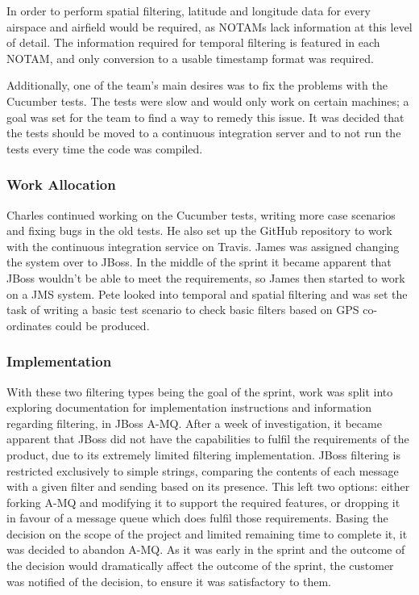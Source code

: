 \documentclass[a4paper, 12pt, twoside]{article}
\begin{document}
In order to perform spatial filtering, latitude and longitude data for every airspace and airfield would be required, as NOTAMs lack information at this level of detail. The information required for temporal filtering is featured in each NOTAM, and only conversion to a usable timestamp format was required.

Additionally, one of the team's main desires was to fix the problems with the Cucumber tests. The tests were slow and would only work on certain machines; a goal was set for the team to find a way to remedy this issue. It was decided that the tests should be moved to a continuous integration server and to not run the tests every time the code was compiled.

\subsubsection{Work Allocation}

Charles continued working on the Cucumber tests, writing more case scenarios and fixing bugs in the old tests. He also set up the GitHub repository to work with the continuous integration service on Travis. James was assigned changing the system over to JBoss. In the middle of the sprint it became apparent that JBoss wouldn't be able to meet the requirements, so James then started to work on a JMS system. Pete looked into temporal and spatial filtering and was set the task of writing a basic test scenario to check basic filters based on GPS co-ordinates could be produced.

\subsubsection{Implementation}

With these two filtering types being the goal of the sprint, work was split into exploring documentation for implementation instructions and information regarding filtering, in JBoss A-MQ. After a week of investigation, it became apparent that JBoss did not have the capabilities to fulfil the requirements of the product, due to its extremely limited filtering implementation. JBoss filtering is restricted exclusively to simple strings, comparing the contents of each message with a given filter and sending based on its presence. This left two options: either forking A-MQ and modifying it to support the required features, or dropping it in favour of a message queue which does fulfil those requirements. Basing the decision on the scope of the project and limited remaining time to complete it, it was decided to abandon A-MQ. As it was early in the sprint and the outcome of the decision would dramatically affect the outcome of the sprint, the customer was notified of the decision, to ensure it was satisfactory to them.
\end{document}
